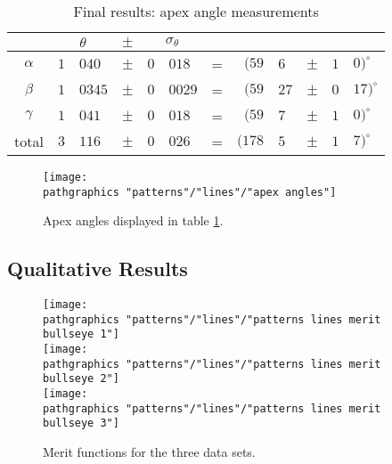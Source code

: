   \begin{table}[htbp]  %
    \caption{Final results: apex angle measurements}
    \begin{center}
      \begin{tabular}{c r@{.}l c r@{.}l c r@{.}l c r@{.}l}
        & \multicolumn{2}{c}{$\theta$} & $\pm$ & \multicolumn{2}{c}{$\sigma_{\theta}$} \\\hline
        $\alpha$ & $1$ & $040$  & $\pm$ & $0$ & $018$  & = & $(59$ & $6$ & $\pm$ & $1$ & $0)^{\circ}$\\
        $\beta$  & $1$ & $0345$ & $\pm$ & $0$ & $0029$ & = & $(59$ & $27$ & $\pm$ & $0$ & $17)^{\circ}$\\
        $\gamma$ & $1$ & $041$  & $\pm$ & $0$ & $018$  & = & $(59$ & $7$ & $\pm$ & $1$ & $0)^{\circ}$\\\arrayrulecolor{medgray}\hline
        total    & $3$ & $116$  & $\pm$ & $0$ & $026$  & = & $(178$ & $5$ & $\pm$ & $1$ & $7)^{\circ}$
      \end{tabular}
    \end{center}
  \label{tab:apex angles}
  \end{table}%

\begin{figure}[htbp] %
   \centering
   \texttt{[image: \\pathgraphics "patterns"/"lines"/"apex angles"]} 
   \caption{Apex angles displayed in table \ref{tab:apex angles}.}
   \label{fig:pattern needles}
\end{figure}

\subsection{Qualitative Results}  %

\begin{figure}[htbp] %
   \centering
   \hspace{-2in}\texttt{[image: \\pathgraphics "patterns"/"lines"/"patterns lines merit bullseye 1"]} \\[5pt]
   \texttt{[image: \\pathgraphics "patterns"/"lines"/"patterns lines merit bullseye 2"]} \\[5pt]
   \hspace{2in} \texttt{[image: \\pathgraphics "patterns"/"lines"/"patterns lines merit bullseye 3"]} 
   \caption{Merit functions for the three data sets.}
   \label{fig:3 bullseyes}
\end{figure}

\endinput